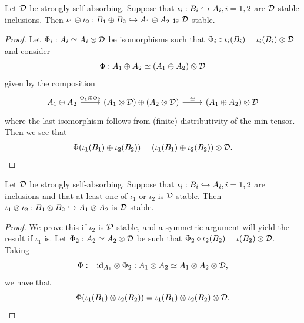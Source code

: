 \documentclass[12pt]{amsart}
\begin{document}
    \begin{lemma}
Let $\mathcal{D}$ be strongly self-absorbing.
Suppose that $\iota_i: B_i \hookrightarrow A_i, i=1,2$ are $\mathcal{D}$-stable inclusions. Then $\iota_1 \oplus \iota_2: B_1 \oplus B_2 \hookrightarrow A_1 \oplus A_2$ is $\mathcal{D}$-stable.
        \begin{proof}
          Let $\Phi_i: A_i \simeq A_i \otimes \mathcal{D}$ be isomorphisms such that $\Phi_i\circ \iota_i(B_i) = \iota_i(B_i) \otimes \mathcal{D}$ and consider
\begin{equation}
          \Phi: A_1 \oplus A_2 \simeq (A_1 \oplus A_2) \otimes \mathcal{D}
\end{equation}
          given by the composition
\begin{equation}
          \begin{tikzcd}
A_1 \oplus A_2 \arrow[r, "\Phi_1 \oplus \Phi_2"] & (A_1 \otimes \cD) \oplus (A_2 \otimes \cD) \arrow[r, "\simeq"] & (A_1 \oplus A_2) \otimes \cD
\end{tikzcd}
\end{equation}
where the last isomorphism follows from (finite) distributivity of the min-tensor. Then we see that
\begin{equation}
\Phi(\iota_1(B_1) \oplus \iota_2(B_2)) = \left(\iota_1(B_1) \oplus \iota_2(B_2)\right) \otimes \mathcal{D}.
\end{equation}
        \end{proof}
    \end{lemma}

      \begin{lemma}
Let $\mathcal{D}$ be strongly self-absorbing.        
        Suppose that $\iota_i: B_i \hookrightarrow A_i, i=1,2$ are inclusions and that at least one of $\iota_1$ or $\iota_2$ is $\mathcal{D}$-stable. Then $\iota_1 \otimes \iota_2: B_1 \otimes B_2 \hookrightarrow A_1 \otimes A_2$ is $\mathcal{D}$-stable. 
          \begin{proof}
            We prove this if $\iota_2$ is $\mathcal{D}$-stable, and a symmetric argument will yield the result if $\iota_1$ is. Let $\Phi_2: A_2 \simeq A_2 \otimes \mathcal{D}$ be such that $\Phi_2 \circ \iota_2(B_2) = \iota(B_2) \otimes \mathcal{D}$. Taking
\begin{equation}
            \Phi := \text{id}_{A_1} \otimes \Phi_2: A_1 \otimes A_2 \simeq A_1 \otimes A_2 \otimes \mathcal{D},
\end{equation}
            we have that
\begin{equation}
            \Phi(\iota_1(B_1) \otimes \iota_2(B_2)) = \iota_1(B_1) \otimes \iota_2(B_2) \otimes \mathcal{D}.
\end{equation}
          \end{proof}
      \end{lemma}
      
\end{document}
